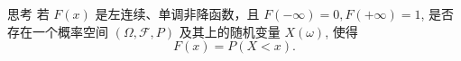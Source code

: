  \begin{frame}{思考}
	 若 $F (x)$ 是左连续、单调非降函数，且 $F (-\infty)=0, F (+\infty)=1$, 是否存在一个概率空间 $(\Omega,\mathcal{F},P)$ 及其上的随机变量 $X (\omega)$, 使得
	 \[F(x)=P(X<x).\]



 \end{frame}




